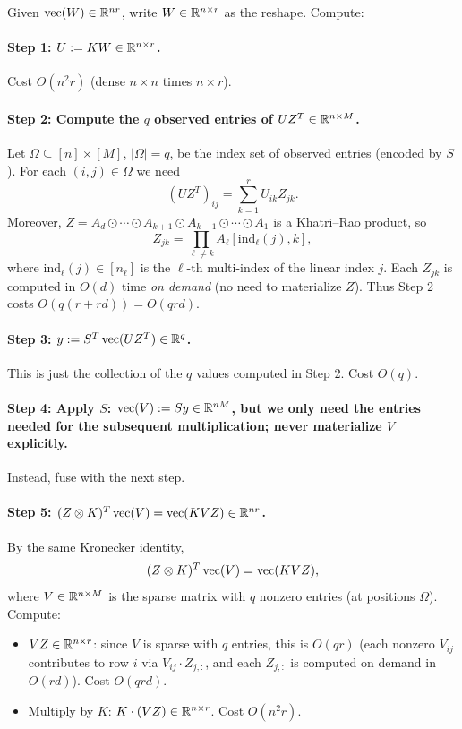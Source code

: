 Given $\operatorname{vec}(W)\in\mathbb{R}^{nr}$, write $W\in\mathbb{R}^{n\times r}$ as the reshape. Compute:

\paragraph{Step 1: $U := KW\in\mathbb{R}^{n\times r}$.} Cost $O(n^2 r)$ (dense $n\times n$ times $n\times r$).

\paragraph{Step 2: Compute the $q$ observed entries of $UZ^T\in\mathbb{R}^{n\times M}$.} Let $\Omega\subseteq[n]\times[M]$, $|\Omega|=q$, be the index set of observed entries (encoded by $S$). For each $(i,j)\in\Omega$ we need
\[
   (UZ^T)_{ij} = \sum_{k=1}^r U_{ik} Z_{jk}.
\]
Moreover, $Z = A_d \odot\cdots\odot A_{k+1}\odot A_{k-1}\odot\cdots\odot A_1$ is a Khatri--Rao product, so
\[
   Z_{jk} = \prod_{\ell\neq k} A_\ell[\mathrm{ind}_\ell(j), k],
\]
where $\mathrm{ind}_\ell(j)\in[n_\ell]$ is the $\ell$-th multi-index of the linear index $j$. Each $Z_{jk}$ is computed in $O(d)$ time \emph{on demand} (no need to materialize $Z$). Thus Step 2 costs $O(q(r+rd)) = O(qrd)$.

\paragraph{Step 3: $y := S^T\operatorname{vec}(UZ^T)\in\mathbb{R}^q$.} This is just the collection of the $q$ values computed in Step 2. Cost $O(q)$.

\paragraph{Step 4: Apply $S$: $\operatorname{vec}(V) := S y\in\mathbb{R}^{nM}$, but we only need the entries needed for the subsequent multiplication; never materialize $V$ explicitly.} Instead, fuse with the next step.

\paragraph{Step 5: $(Z\otimes K)^T\operatorname{vec}(V) = \operatorname{vec}(K V Z)\in\mathbb{R}^{nr}$.} By the same Kronecker identity,
\[
   (Z\otimes K)^T\operatorname{vec}(V) = \operatorname{vec}(K V Z),
\]
where $V\in\mathbb{R}^{n\times M}$ is the sparse matrix with $q$ nonzero entries (at positions $\Omega$). Compute:
\begin{itemize}
\item $V Z\in\mathbb{R}^{n\times r}$: since $V$ is sparse with $q$ entries, this is $O(qr)$ (each nonzero $V_{ij}$ contributes to row $i$ via $V_{ij}\cdot Z_{j,:}$, and each $Z_{j,:}$ is computed on demand in $O(rd)$). Cost $O(qrd)$.
\item Multiply by $K$: $K\cdot(VZ)\in\mathbb{R}^{n\times r}$. Cost $O(n^2 r)$.
\end{itemize}


